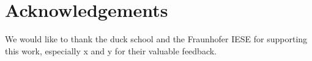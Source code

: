 \documentclass[a4paper]{article}
\begin{document}



\section*{Acknowledgements}

We would like to thank the duck school and the Fraunhofer IESE for supporting this work, especially x and y for their valuable feedback.

\printbibliography
\end{document}
